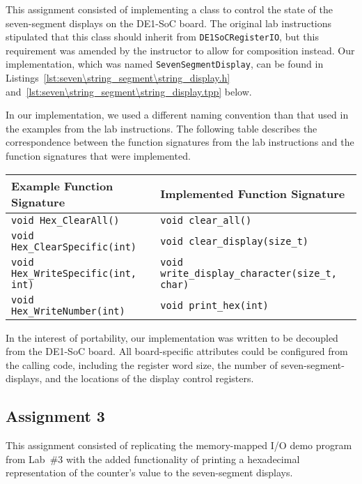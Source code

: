 \documentclass[11pt, letterpaper]{article} %
\begin{document}
This assignment consisted of implementing a class to control the state of the seven-segment displays on the DE1-SoC board. The original lab instructions stipulated that this class should inherit from \texttt{DE1SoCRegisterIO}, but this requirement was amended by the instructor to allow for composition instead. Our implementation, which was named \texttt{SevenSegmentDisplay}, can be found in  Listings~\ref{lst:seven\string_segment\string_display.h} and~\ref{lst:seven\string_segment\string_display.tpp} below.

In our implementation, we used a different naming convention than that used in the examples from the lab instructions.  The following table describes the correspondence between the function signatures from the lab instructions and the function signatures that were implemented.

\begin{table}[h]\centering
    \begin{tabular}{ll}
        \hline
        \textbf{Example Function Signature} & \textbf{Implemented Function Signature}\\
        \hline
        \texttt{void Hex\_ClearAll()} & \texttt{void clear\_all()}\\
        \texttt{void Hex\_ClearSpecific(int)} & \texttt{void clear\_display(size\_t)}\\
        \texttt{void Hex\_WriteSpecific(int, int)} & \texttt{void write\_display\_character(size\_t, char)}\\
        \texttt{void Hex\_WriteNumber(int)} & \texttt{void print\_hex(int)}\\
        \hline
    \end{tabular}
\end{table}

In the interest of portability, our implementation was written to be decoupled from the DE1-SoC board. All board-specific attributes could be configured from the calling code, including the register word size, the number of seven-segment-displays, and the locations of the display control registers.

\subsection*{Assignment 3}

This assignment consisted of replicating the memory-mapped I/O demo program from Lab~\#3 \cite{report-3} with the added functionality of printing a hexadecimal representation of the counter's value to the seven-segment displays.
\end{document}
